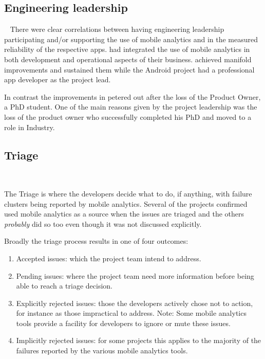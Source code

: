\subsection{Engineering leadership}~\label{aiu-engineering-leadership-topic}
There were clear correlations between having engineering leadership participating and/or supporting the use of mobile analytics and in the measured reliability of the respective apps.  had integrated the use of mobile analytics in both development and operational aspects of their business.  achieved manifold improvements and sustained them while the Android project had a professional app developer as the project lead. 

In contrast the improvements in  petered out after the loss of the Product Owner, a PhD student. One of the main reasons given by the project leadership was the loss of the product owner who successfully completed his PhD and moved to a role in Industry. 


\subsection{Triage}~\label{aiu-triage-theme}

The Triage is where the developers decide what to do, if anything, with failure clusters being reported by mobile analytics. Several of the projects confirmed used mobile analytics as a source when the issues are triaged and the others \textit{probably} did so too even though it was not discussed explicitly.

Broadly the triage process results in one of four outcomes:
\begin{enumerate}
    \item Accepted issues: which the project team intend to address.
    \item Pending issues: where the project team need more information before being able to reach a triage decision.
    \item Explicitly rejected issues: those the developers actively chose not to action, for instance as those impractical to address. Note: Some mobile analytics tools provide a facility for developers to ignore or mute these issues.
    \item Implicitly rejected issues: for some projects this applies to the majority of the failures reported by the various mobile analytics tools.
\end{enumerate}


